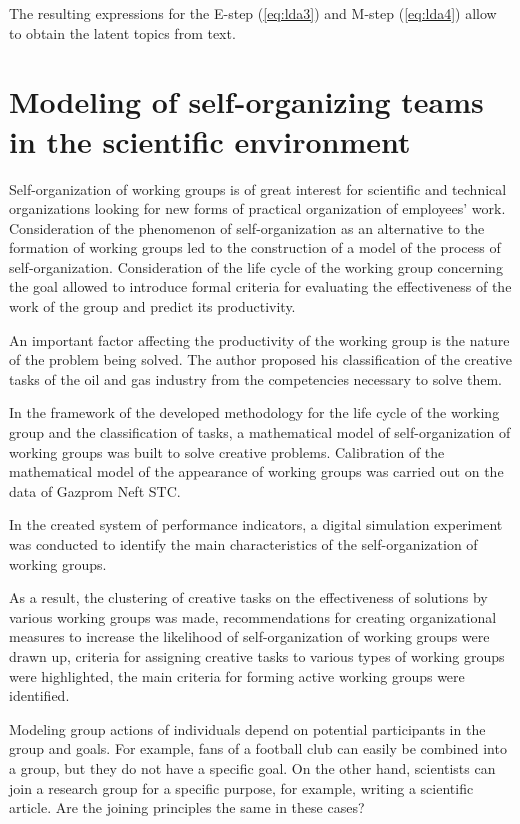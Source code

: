 \documentclass[12pt]{report}
\theoremstyle{definition}
\begin{document}
The resulting expressions for the E-step (\ref{eq:lda3}) and M-step (\ref{eq:lda4}) allow to obtain the latent topics from text.

\section{Modeling of self-organizing teams in the scientific environment}
\label{sec:moso}

Self-organization of working groups is of great interest for scientific and technical organizations looking for new forms of practical organization of employees' work.
Consideration of the phenomenon of self-organization as an alternative to the formation of working groups led to the construction of a model of the process of self-organization.
Consideration of the life cycle of the working group concerning the goal allowed to introduce formal criteria for evaluating the effectiveness of the work of the group and predict its productivity.

An important factor affecting the productivity of the working group is the nature of the problem being solved.
The author proposed his classification of the creative tasks of the oil and gas industry from the competencies necessary to solve them.

In the framework of the developed methodology for the life cycle of the working group and the classification of tasks, a mathematical model of self-organization of working groups was built to solve creative problems. Calibration of the mathematical model of the appearance of working groups was carried out on the data of Gazprom Neft STC.

In the created system of performance indicators, a digital simulation experiment was conducted to identify the main characteristics of the self-organization of working groups.

As a result, the clustering of creative tasks on the effectiveness of solutions by various working groups was made, recommendations for creating organizational measures to increase the likelihood of self-organization of working groups were drawn up, criteria for assigning creative tasks to various types of working groups were highlighted, the main criteria for forming active working groups were identified.

Modeling group actions of individuals depend on potential participants in the group and goals.
For example, fans of a football club can easily be combined into a group, but they do not have a specific goal.
On the other hand, scientists can join a research group for a specific purpose, for example, writing a scientific article.
Are the joining principles the same in these cases?
\end{document}

